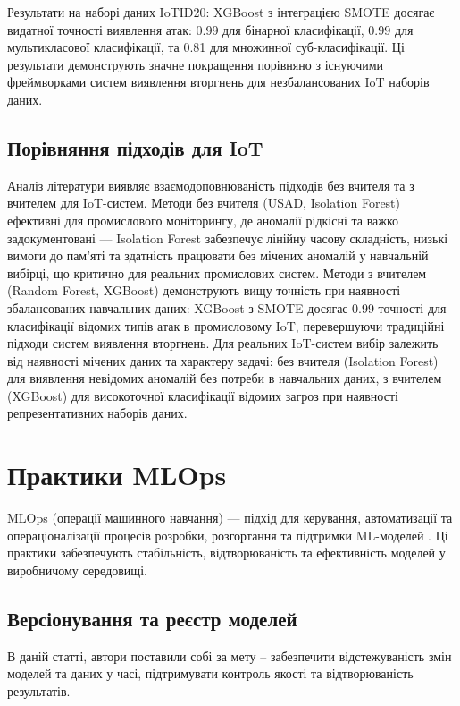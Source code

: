 Результати на наборі даних IoTID20: XGBoost з інтеграцією SMOTE досягає видатної точності виявлення атак: 0.99 для бінарної класифікації, 0.99 для мультикласової класифікації, та 0.81 для множинної суб-класифікації. Ці результати демонструють значне покращення порівняно з існуючими фреймворками систем виявлення вторгнень для незбалансованих IoT наборів даних.

\subsection{Порівняння підходів для IoT}

Аналіз літератури виявляє взаємодоповнюваність підходів без вчителя та з вчителем для IoT-систем. Методи без вчителя (USAD, Isolation Forest) ефективні для промислового моніторингу, де аномалії рідкісні та важко задокументовані --- Isolation Forest забезпечує лінійну часову складність, низькі вимоги до пам'яті та здатність працювати без мічених аномалій у навчальній вибірці, що критично для реальних промислових систем. Методи з вчителем (Random Forest, XGBoost) демонструють вищу точність при наявності збалансованих навчальних даних: XGBoost з SMOTE досягає 0.99 точності для класифікації відомих типів атак в промисловому IoT, перевершуючи традиційні підходи систем виявлення вторгнень. Для реальних IoT-систем вибір залежить від наявності мічених даних та характеру задачі: без вчителя (Isolation Forest) для виявлення невідомих аномалій без потреби в навчальних даних, з вчителем (XGBoost) для високоточної класифікації відомих загроз при наявності репрезентативних наборів даних.


\section{Практики MLOps}

MLOps (операції машинного навчання) --- підхід для керування, автоматизації та операціоналізації процесів розробки, розгортання та підтримки ML-моделей \cite{hanchuk2025implementing}. Ці практики забезпечують стабільність, відтворюваність та ефективність моделей у виробничому середовищі.

\subsection{Версіонування та реєстр моделей}

В даній статті, автори поставили собі за мету -- забезпечити відстежуваність змін моделей та даних у часі, підтримувати контроль якості та відтворюваність результатів.


